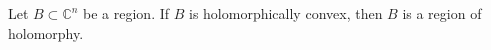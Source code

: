Let $B \subset \mathbb{C}^n$ be a region. If $B$ is holomorphically convex, then $B$ is a region of holomorphy.
